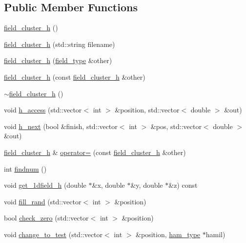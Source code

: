 \subsection*{Public Member Functions}
\begin{DoxyCompactItemize}
\item 
\hyperlink{classfield__cluster__h_a541bf81d40c5c5b6018c9d82f0eef578}{field\+\_\+cluster\+\_\+h} ()
\item 
\hyperlink{classfield__cluster__h_a8d0ea4d405ea4262a6681a25ffa74887}{field\+\_\+cluster\+\_\+h} (std\+::string filename)
\item 
\hyperlink{classfield__cluster__h_ab0eeee37bfb2f631c28e61c6e2086ad6}{field\+\_\+cluster\+\_\+h} (\hyperlink{classfield__type}{field\+\_\+type} \&other)
\item 
\hyperlink{classfield__cluster__h_a773569b54484ddff605306f368ea3641}{field\+\_\+cluster\+\_\+h} (const \hyperlink{classfield__cluster__h}{field\+\_\+cluster\+\_\+h} \&other)
\item 
\hyperlink{classfield__cluster__h_ad551ba1f8ee8cff03f97c6f5bdbd9133}{$\sim$field\+\_\+cluster\+\_\+h} ()
\item 
void \hyperlink{classfield__cluster__h_a5fd85ce8a88cb66118073e9b78ad42ba}{h\+\_\+access} (std\+::vector$<$ int $>$ \&position, std\+::vector$<$ double $>$ \&out)
\item 
void \hyperlink{classfield__cluster__h_a52bd59a7a1bd2be4c2aa83eedffe4a32}{h\+\_\+next} (bool \&finish, std\+::vector$<$ int $>$ \&pos, std\+::vector$<$ double $>$ \&out)
\item 
\hyperlink{classfield__cluster__h}{field\+\_\+cluster\+\_\+h} \& \hyperlink{classfield__cluster__h_aae54da56698bc8cf802d41fda39c0394}{operator=} (const \hyperlink{classfield__cluster__h}{field\+\_\+cluster\+\_\+h} \&other)
\item 
int \hyperlink{classfield__cluster__h_a8beeff6c5d5e7da194b5d57edcb04a08}{findnum} ()
\item 
void \hyperlink{classfield__cluster__h_a62630531cca5826f6077170d4f2fca94}{get\+\_\+1dfield\+\_\+h} (double $\ast$\&x, double $\ast$\&y, double $\ast$\&z) const 
\item 
void \hyperlink{classfield__cluster__h_a743d4b8bd643f1207ccf86d1e1a2f193}{fill\+\_\+rand} (std\+::vector$<$ int $>$ \&position)
\item 
bool \hyperlink{classfield__cluster__h_a0dd1c3a0c8b72ae2501dc5a06967b484}{check\+\_\+zero} (std\+::vector$<$ int $>$ \&position)
\item 
void \hyperlink{classfield__cluster__h_ad999087d163d4de0adc1e659703cf8a4}{change\+\_\+to\+\_\+test} (std\+::vector$<$ int $>$ \&position, \hyperlink{classham__type}{ham\+\_\+type} $\ast$hamil)
\end{DoxyCompactItemize}
